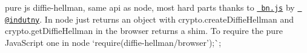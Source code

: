 pure js diffie-\/hellman, same api as node, most hard parts thanks to \href{https://www.npmjs.org/package/bn.js}{\texttt{ bn.\+js}} by \href{https://github.com/indutny}{\texttt{ @indutny}}. In node just returns an object with {\ttfamily crypto.\+create\+Diffie\+Hellman} and {\ttfamily crypto.\+get\+Diffie\+Hellman} in the browser returns a shim. To require the pure Java\+Script one in node `require(\textquotesingle{}diffie-\/hellman/browser');\`{}; 